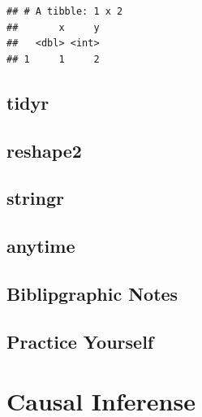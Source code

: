 \documentclass[]{book}
\newenvironment{Shaded}{\begin{snugshade}}{\end{snugshade}}
\newcommand{\CommentTok}[1]{\textcolor[rgb]{0.56,0.35,0.01}{\textit{#1}}}
\newcommand{\DataTypeTok}[1]{\textcolor[rgb]{0.13,0.29,0.53}{#1}}
\newcommand{\KeywordTok}[1]{\textcolor[rgb]{0.13,0.29,0.53}{\textbf{#1}}}
\newcommand{\NormalTok}[1]{#1}
\newcommand{\OperatorTok}[1]{\textcolor[rgb]{0.81,0.36,0.00}{\textbf{#1}}}
\newcommand{\StringTok}[1]{\textcolor[rgb]{0.31,0.60,0.02}{#1}}
\theoremstyle{definition}
\theoremstyle{definition}
\theoremstyle{definition}
\theoremstyle{remark}
\begin{document}
\begin{Shaded}
\end{Shaded}

\begin{verbatim}
## # A tibble: 1 x 2
##       x     y
##   <dbl> <int>
## 1     1     2
\end{verbatim}

\hypertarget{tidyr}{%
\section{tidyr}\label{tidyr}}

\hypertarget{reshape2}{%
\section{reshape2}\label{reshape2}}

\hypertarget{stringr}{%
\section{stringr}\label{stringr}}

\hypertarget{anytime}{%
\section{anytime}\label{anytime}}

\hypertarget{biblipgraphic-notes}{%
\section{Biblipgraphic Notes}\label{biblipgraphic-notes}}

\hypertarget{practice-yourself-17}{%
\section{Practice Yourself}\label{practice-yourself-17}}

\hypertarget{causality}{%
\chapter{Causal Inferense}\label{causality}}
\end{document}

